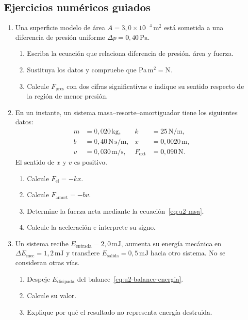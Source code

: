 \subsection*{Ejercicios numéricos guiados}

\begin{enumerate}[label=\textbf{NG\arabic*.},leftmargin=*]
    \item Una superficie modelo de área
    \(A=3{,}0\times10^{-4}\,\text{m}^{2}\) está sometida a una diferencia de
    presión uniforme \(\Delta p=0{,}40\,\text{Pa}\).
    \begin{enumerate}[label=\alph*)]
        \item Escriba la ecuación que relaciona diferencia de presión, área y
        fuerza.
        \item Sustituya los datos y compruebe que
        \(\text{Pa}\,\text{m}^{2}=\text{N}\).
        \item Calcule \(F_\mathrm{pres}\) con dos cifras significativas e
        indique su sentido respecto de la región de menor presión.
    \end{enumerate}

    \item En un instante, un sistema masa--resorte--amortiguador tiene los
    siguientes datos:
    \[
        \begin{aligned}
            m &= 0{,}020\,\text{kg},&
            k &= 25\,\text{N}/\text{m},\\
            b &= 0{,}40\,\text{N}\,\text{s}/\text{m},&
            x &= 0{,}0020\,\text{m},\\
            v &= 0{,}030\,\text{m}/\text{s},&
            F_\mathrm{ext} &= 0{,}090\,\text{N}.
        \end{aligned}
    \]
    El sentido de \(x\) y \(v\) es positivo.
    \begin{enumerate}[label=\alph*)]
        \item Calcule \(F_\mathrm{el}=-kx\).
        \item Calcule \(F_\mathrm{amort}=-bv\).
        \item Determine la fuerza neta mediante la
        ecuación~\eqref{eq:u2-msa}.
        \item Calcule la aceleración e interprete su signo.
    \end{enumerate}

    \item Un sistema recibe \(E_\mathrm{entrada}=2{,}0\,\text{mJ}\), aumenta su
    energía mecánica en
    \(\Delta E_\mathrm{mec}=1{,}2\,\text{mJ}\) y transfiere
    \(E_\mathrm{salida}=0{,}5\,\text{mJ}\) hacia otro sistema. No se consideran
    otras vías.
    \begin{enumerate}[label=\alph*)]
        \item Despeje \(E_\mathrm{disipada}\) del
        balance~\eqref{eq:u2-balance-energia}.
        \item Calcule su valor.
        \item Explique por qué el resultado no representa energía destruida.
    \end{enumerate}


\end{enumerate}
